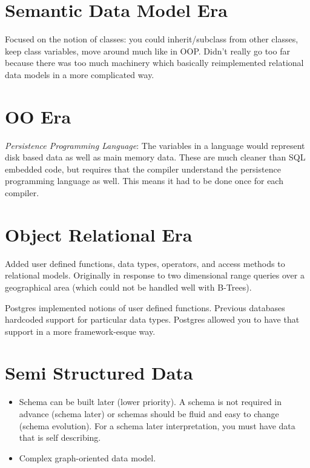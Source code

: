 \documentclass[psamsfonts]{amsart}
\begin{document}
\section{Semantic Data Model Era}

Focused on the notion of classes: you could inherit/subclass from other classes, keep class variables, move around much like in OOP. Didn't really go too far because there was too much machinery which basically reimplemented relational data models in a more complicated way.

\section{OO Era}

\emph{Persistence Programming Language}: The variables in a language would represent disk based data as well as main memory data. These are much cleaner than SQL embedded code, but requires that the compiler understand the persistence programming language as well. This means it had to be done once for each compiler.

\section{Object Relational Era}

Added user defined functions, data types, operators, and access methods to relational models. Originally in response to two dimensional range queries over a geographical area (which could not be handled well with B-Trees).

Postgres implemented notions of user defined functions. Previous databases hardcoded support for particular data types. Postgres allowed you to have that support in a more framework-esque way.

\section{Semi Structured Data}

\begin{itemize}
  \item Schema can be built later (lower priority). A schema is not required in advance (schema later) or schemas should be fluid and easy to change (schema evolution). For a schema later interpretation, you must have data that is self describing. 
  \item Complex graph-oriented data model.
\end{itemize}
\end{document}

